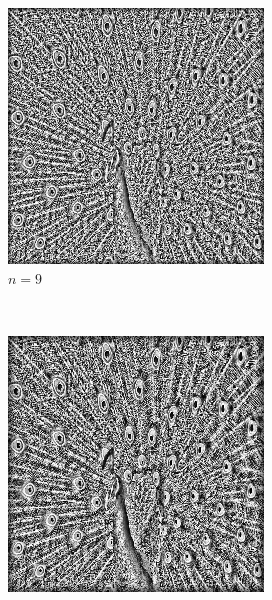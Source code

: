 \documentclass{article}
\begin{document}
\begin{enumerate}[label=(\alph*)]
\begin{figure}[!htb]
        \begin{subfigure}[b]{0.3\textwidth}
            \includegraphics[width=\textwidth]{img/L9.png}
            \caption{$n = 9$}
        \end{subfigure}
        ~
        \begin{subfigure}[b]{0.3\textwidth}
            \includegraphics[width=\textwidth]{img/L15.png}

\end{subfigure}
\end{figure}
\end{enumerate}
\end{document}
